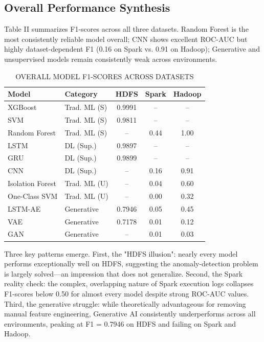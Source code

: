 \documentclass[conference]{IEEEtran}
\begin{document}
\subsection{Overall Performance Synthesis}
Table II summarizes F1-scores across all three datasets. Random Forest is the most consistently reliable model overall; CNN shows excellent ROC-AUC but highly dataset-dependent F1 (0.16 on Spark vs. 0.91 on Hadoop); Generative and unsupervised models remain consistently weak across environments.

\begin{table}[htbp]
\caption{OVERALL MODEL F1-SCORES ACROSS DATASETS}
\begin{center}
\begin{tabular}{|l|l|c|c|c|}
\hline
\textbf{Model} & \textbf{Category} & \textbf{HDFS} & \textbf{Spark} & \textbf{Hadoop} \\ \hline
XGBoost & Trad. ML (S) & 0.9991 & -- & -- \\ \hline
SVM & Trad. ML (S) & 0.9811 & -- & -- \\ \hline
Random Forest & Trad. ML (S) & -- & 0.44 & 1.00 \\ \hline
LSTM & DL (Sup.) & 0.9897 & -- & -- \\ \hline
GRU & DL (Sup.) & 0.9899 & -- & -- \\ \hline
CNN & DL (Sup.) & -- & 0.16 & 0.91 \\ \hline
Isolation Forest & Trad. ML (U) & -- & 0.04 & 0.60 \\ \hline
One-Class SVM & Trad. ML (U) & -- & 0.00 & 0.32 \\ \hline
LSTM-AE & Generative & 0.7946 & 0.05 & 0.45 \\ \hline
VAE & Generative & 0.7178 & 0.01 & 0.12 \\ \hline
GAN & Generative & -- & 0.01 & 0.03 \\ \hline
\end{tabular}
\end{center}
\end{table}

Three key patterns emerge. First, the "HDFS illusion": nearly every model performs exceptionally well on HDFS, suggesting the anomaly-detection problem is largely solved---an impression that does not generalize. Second, the Spark reality check: the complex, overlapping nature of Spark execution logs collapses F1-scores below 0.50 for almost every model despite strong ROC-AUC values. Third, the generative struggle: while theoretically advantageous for removing manual feature engineering, Generative AI consistently underperforms across all environments, peaking at F1 = 0.7946 on HDFS and failing on Spark and Hadoop.
\end{document}
